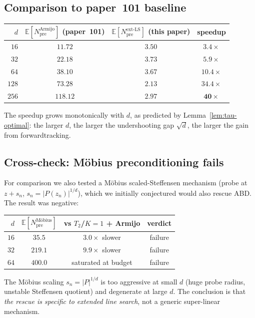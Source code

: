 \documentclass[11pt,a4paper]{article}
\begin{document}
\subsection{Comparison to paper~101 baseline}

\begin{center}
\begin{tabular}{rccc}
\toprule
$d$ & $\mathbb{E}[N_{\text{pre}}^{\text{Armijo}}]$ (paper~101) & $\mathbb{E}[N_{\text{pre}}^{\text{ext-LS}}]$ (this paper) & speedup \\
\midrule
$16$  & $11.72$  & $3.50$ & $3.4\times$ \\
$32$  & $22.18$  & $3.73$ & $5.9\times$ \\
$64$  & $38.10$  & $3.67$ & $10.4\times$ \\
$128$ & $73.28$  & $2.13$ & $34.4\times$ \\
$256$ & $118.12$ & $2.97$ & $\mathbf{40\times}$ \\
\bottomrule
\end{tabular}
\end{center}

The speedup grows monotonically with $d$, as predicted by Lemma~\ref{lem:tau-optimal}: the larger $d$, the larger the undershooting gap $\sqrt d$, the larger the gain from forwardtracking.

\subsection{Cross-check: Möbius preconditioning fails}\label{sec:mobius-fail}

For comparison we also tested a Möbius scaled-Steffensen mechanism (probe at $z + s_n$, $s_n = |P(z_n)|^{1/d}$), which we initially conjectured would also rescue ABD. The result was negative:

\begin{center}
\begin{tabular}{rccc}
\toprule
$d$ & $\mathbb{E}[N_{\text{pre}}^{\text{M\"obius}}]$ & vs $T_2$/$K{=}1$ + Armijo & verdict \\
\midrule
$16$ & $35.5$  & $3.0\times$ slower & failure \\
$32$ & $219.1$ & $9.9\times$ slower & failure \\
$64$ & $400.0$ & saturated at budget & failure \\
\bottomrule
\end{tabular}
\end{center}

The Möbius scaling $s_n = |P|^{1/d}$ is too aggressive at small $d$ (huge probe radius, unstable Steffensen quotient) and degenerate at large $d$. The conclusion is that \emph{the rescue is specific to extended line search}, not a generic super-linear mechanism.
\end{document}
